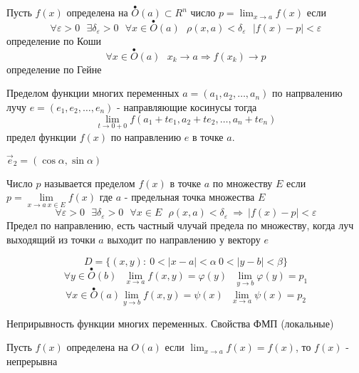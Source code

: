 \begin{define}
  Пусть $f(x)$ определена на $\stackrel{\bullet}{O}(a) \subset R^n$ число
  $p = \lim_{x \to a} f(x)$ если
  $$
  \forall \varepsilon > 0 ~~~ \exists \delta_{\varepsilon} > 0 ~~~
  \forall x \in \stackrel{\bullet}{O}(a) ~~~ \rho(x, a) < \delta_{\varepsilon}
  ~~~ |f(x) - p| < \varepsilon
  $$
  определение по Коши
  $$
  \forall x \in \stackrel{\bullet}{O}(a) ~~~ x_k \to a \Rightarrow f(x_k) \to p
  $$
  определение по Гейне
\end{define}

\begin{define}
  Пределом функции многих переменных $a = (a_1, a_2, \ldots, a_n)$ по
  напрвалению лучу $e = (e_1, e_2, \ldots, e_n)$ - направляющие косинусы тогда
  $$
  \lim_{t \to 0 +0} f(a_1 + te_1, a_2 + te_2, \ldots, a_n + te_n)
  $$
  предел функции $f(x)$ по направлению $e$ в точке $a$.

  $\vec e_2 = (\cos \alpha, \sin \alpha)$
\end{define}

\begin{define}
  Число $p$ называется пределом $f(x)$ в точке $a$ по множеству $E$ если
  $p = \lim \limits_{x \to a ~ x \in E} f(x)$ где $a$ - предельная точка
  множества $E$
  $$
  \forall \varepsilon > 0 ~~~ \exists \delta_{\varepsilon} > 0 ~~~
  \forall x \in E ~~~ \rho(x, a) < \delta_{\varepsilon} ~ \Rightarrow ~
  |f(x) - p| < \varepsilon
  $$
  Предел по направлению, есть частный члучай предела по множеству, когда луч
  выходящий из точки $a$ выходит по направлению у вектору $e$

  $$
  D = \{ (x,y): ~ 0 < |x - a| < \alpha ~ 0 < |y - b| < \beta \}
  $$
  $$
  \forall y \in \stackrel{\bullet}{O}(b) ~~~
  \lim_{x \to a} f(x, y) = \varphi(y) ~~~ \lim_{y \to b} \varphi(y) = p_1
  $$
  $$
  \forall x \in \stackrel{\bullet}{O}(a)
  \lim_{y \to b} f(x, y) = \psi(x) ~~~ \lim_{x \to a} \psi(x) = p_2
  $$
\end{define}

\begin{title}[\Large]
  Неприрывность функции многих переменных. Свойства ФМП (локальные)
\end{title}

\begin{define}
  Пусть $f(x)$ определена на $O(a)$ если $\lim_{x \to a} f(x) = f(x)$, то
  $f(x)$ - непрерывна
\end{define}

